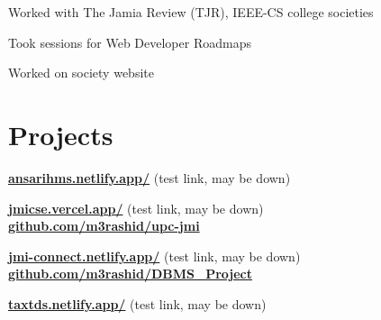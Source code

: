 \documentclass[]{deedy-resume-openfont}
\begin{document}
\begin{minipage}[t]{0.66\textwidth}
\vspace{\topsep}
\begin{tightemize}
\item Worked with The Jamia Review (TJR), IEEE-CS college societies
\item Took sessions for Web Developer Roadmaps
\item Worked on society website
\end{tightemize}
\sectionsep


\section{Projects} 
\href{https://ansarihms.netlify.app/}{\bf ansarihms.netlify.app/} (test link, may be down)
\sectionsep

\href{https://jmicse.vercel.app/}{\bf jmicse.vercel.app/} (test link, may be down) \\
\href{https://github.com/m3rashid/upc-jmi}{\bf github.com/m3rashid/upc-jmi}
\sectionsep

\href{https://jmi-connect.netlify.app/}{\bf jmi-connect.netlify.app/} (test link, may be down) \\
\href{https://github.com/m3rashid/DBMS_Project}{\bf github.com/m3rashid/DBMS\_Project}
\sectionsep

\href{https://taxtds.netlify.app/}{\bf taxtds.netlify.app/} (test link, may be down)
\sectionsep

\end{minipage} 
\end{document}

